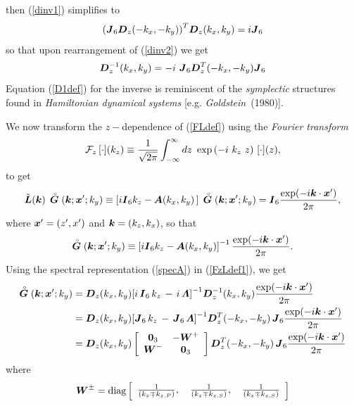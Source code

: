 \documentclass[11pt,a4paper]{article}
\newcommand{\bmi}[1]{\mbox{\boldmath$\mit #1$\unboldmath}}
\newcommand{\rf}[1]{\stackrel{\scriptscriptstyle _{\,\,\circ}}{ #1}}
\begin{document}
 then (\ref{dinv1}) simplifies to
\begin{equation} \label{dinv2}
{\left({{\bmi  J}_{6}{\bmi  D}_{z}(-{k}_{x},-{k}_{y})}\right)}^{T}{\bmi  D}_{z}({k}_{x},{k}_{y})
=i {\bmi  J}_{6}
\end{equation}
so that upon rearrangement of (\ref{dinv2}) we get
\begin{equation}	\label{D1def}
{\bmi  D}_{z}^{-1}({k}_{x},{k}_{y})=-i\	{\bmi  J}_6{\bmi  D}_{z}^{T}(-{k}_{x},-{k}_{y}){\bmi  J}_6
\end{equation}
Equation (\ref{D1def}) for the inverse is reminiscent of the {\em
symplectic\/} structures found in {\em Hamiltonian dynamical systems\/}
[e.g. {\em Goldstein}~(1980)].


We now transform the $z-$dependence of  (\ref{FLdef}) using
the {\em  Fourier transform\/}
\[
{\cal F}_{z}\,
[\cdot] ({k}_{z}) \equiv \frac{1}{\sqrt{2 \pi}}\int_{-\infty }^{ \infty }
dz\ \exp \left({-i\ {k}_{z}\ z}\right)\, [\cdot] (z) ,\]
 to get
\begin{equation}	\label{FzLdef}
	\tilde{\bmi  L}({\bmi k}) \,\rf{\bmi  G}({\bmi k};{\bmi x}^{\prime};k_y) \equiv \left[i
{\bmi  I}_6 {k}_{z} -{\bmi
A}({k}_{x},{k}_{y})\,
	\right]\,\rf{\bmi  G}({\bmi k};{\bmi x}^{\prime};k_y)={\bmi  I}_{6}
	\frac{\exp({-i {\bmi k}\cdot {\bmi x}^{\prime}})}{{2 \pi}},
\end{equation}
where ${\bmi x}^{\prime}=(z^{\prime},x^{\prime})$ and  ${\bmi
k}=(k_{z},k_{x})$, so that
\begin{equation}	\label{FzLdef1}
	\rf{\bmi  G}({\bmi k};{\bmi x}^{\prime};k_y) \equiv
	\left[i {\bmi  I}_6 {k}_{z} -{\bmi  A}({k}_{x},{k}_{y}) \right]^{-1}
	\frac{\exp({-i {\bmi k}\cdot {\bmi x}^{\prime}})}{{2 \pi}}.
\end{equation}
Using the spectral representation (\ref{specA}) in  (\ref{FzLdef1}),
we get
\begin{align} \label{InvLDef0}
\rf{\bmi  G}({\bmi k};{\bmi x}^{\prime};k_y)
&={\bmi  D}_{z}({k}_{x},{k}_{y})
{\left[i\, {\bmi  I}_{6}\, {k}_{z}\, -\, i\,   {\bmi \Lambda} \right]}^{-1}
{\bmi  D}_{z}^{-1}({k}_{x},{k}_{y}) \frac{\exp({-i {\bmi k}\cdot {\bmi x}^{\prime}})}{2 \pi}
\nonumber\\
&={\bmi  D}_{z}({k}_{x},{k}_{y})
{\left[{\bmi  J}_{6}\, {k}_{z}\, - \,{\bmi  J}_{6}\, {\bmi \Lambda}
\right]}^{-1}
{\bmi  D}_{z}^{T}(-{k}_{x},-{k}_{y})\,{\bmi  J}_6
\frac{\exp(-i {\bmi k}\cdot {\bmi x}^{\prime})}{2 \pi}\nonumber\\
&={\bmi  D}_{z}({k}_{x},{k}_{y})
\left[{\begin{array}{cc}{\bf 0}_{3}&-{\bmi W}^{+}\\
{\bmi W}^{-}&{\bf 0}_{3}\end{array}}\right]
{\bmi
D}_{z}^{T}(-{k}_{x},-{k}_{y})
\,{\bmi  J}_6 \frac{\exp(-i {\bmi k}\cdot {\bmi x}^{\prime})}{{2 \pi}}
\end{align}
where
\[
{\bmi W}^{\pm}=\mbox{diag}
\left[\begin{array}{ccc}
\frac{1}{({k}_{z}\mp{k}_{z,P })},\,&\frac{1}{({k}_{z}\mp{k}_{z,S
})},\,&\frac{1}{({k}_{z}\mp{k}_{z,S })}\end{array}\right]
\]
\end{document}
